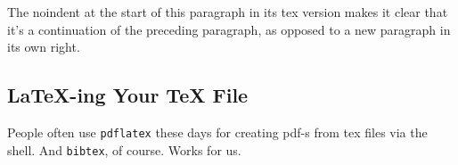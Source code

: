 \noindent
The noindent at the start of this paragraph in its tex version makes
it clear that it's a continuation of the preceding paragraph, as
opposed to a new paragraph in its own right.


\subsection{LaTeX-ing Your TeX File}

People often use \texttt{pdflatex} these days for creating pdf-s from
tex files via the shell. And \texttt{bibtex}, of course. Works for us.
